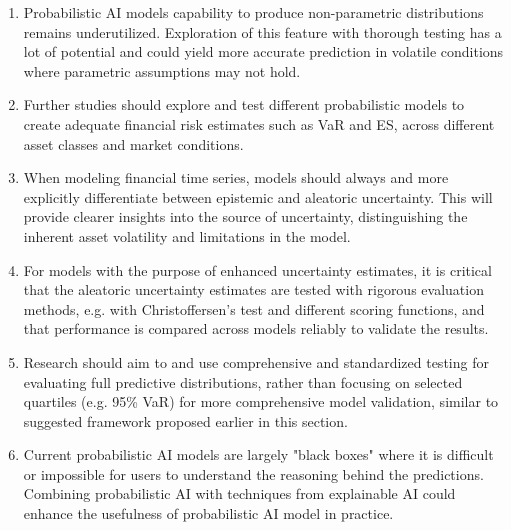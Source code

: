 \begin{enumerate}
    \item Probabilistic AI models capability to produce non-parametric distributions remains underutilized. Exploration of this feature with thorough testing has a lot of potential and could yield more accurate prediction in volatile conditions where parametric assumptions may not hold.
    \item Further studies should explore and test different probabilistic models to create adequate financial risk estimates such as VaR and ES, across different asset classes and market conditions.
    \item When modeling financial time series, models should always and more explicitly differentiate between epistemic and aleatoric uncertainty. This will provide clearer insights into the source of uncertainty, distinguishing the inherent asset volatility and limitations in the model.
    \item For models with the purpose of enhanced uncertainty estimates, it is critical that the aleatoric uncertainty estimates are tested with rigorous evaluation methods, e.g. with Christoffersen's test and different scoring functions, and that performance is compared across models reliably to validate the results.
    \item Research should aim to and use comprehensive and standardized testing for evaluating full predictive distributions, rather than focusing on selected quartiles (e.g. 95\% VaR) for more comprehensive model validation, similar to suggested framework proposed earlier in this section.
    \item Current probabilistic AI models are largely "black boxes" where it is difficult or impossible for users to understand the reasoning behind the predictions. Combining probabilistic AI with techniques from explainable AI could enhance the usefulness of probabilistic AI model in practice.
\end{enumerate}








